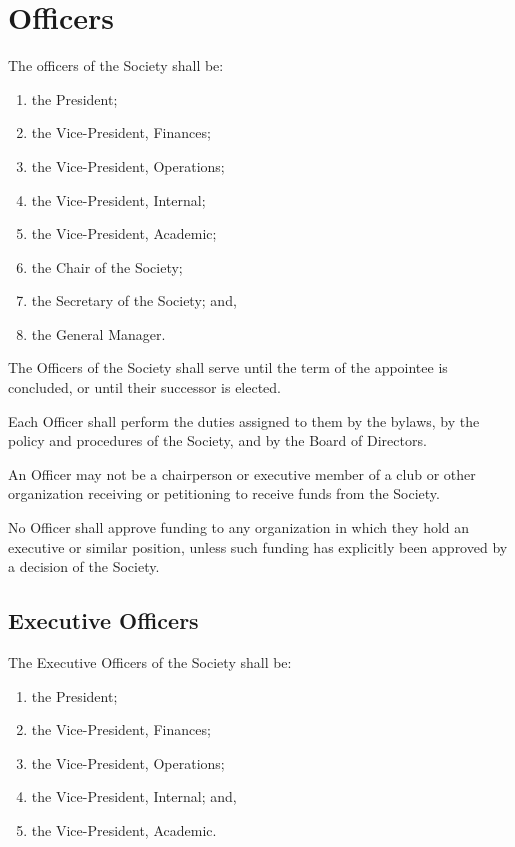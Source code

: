 \section{Officers}

The officers of the Society shall be:
\begin{enumerate}
    \item the President; 
    \item the Vice-President, Finances; 
    \item the Vice-President, Operations; 
    \item the Vice-President, Internal;
    \item the Vice-President, Academic;
    \item the Chair of the Society;
    \item the Secretary of the Society; and,
    \item the General Manager.
\end{enumerate}

The Officers of the Society shall serve until the term of the appointee is
concluded, or until their successor is elected. 

Each Officer shall perform the duties assigned to them by the bylaws, by the
policy and procedures of the Society, and by the Board of Directors.

An Officer may not be a chairperson or executive member of a club or other 
organization receiving or petitioning to receive funds from the Society. 

No Officer shall approve funding to any organization in which they hold an
executive or similar position, unless such funding has explicitly been approved
by a decision of the Society.

\subsection{Executive Officers}
The Executive Officers of the Society shall be: \begin{enumerate}
    \item the President; 
    \item the Vice-President, Finances; 
    \item the Vice-President, Operations; 
    \item the Vice-President, Internal; and,
    \item the Vice-President, Academic.
\end{enumerate}

